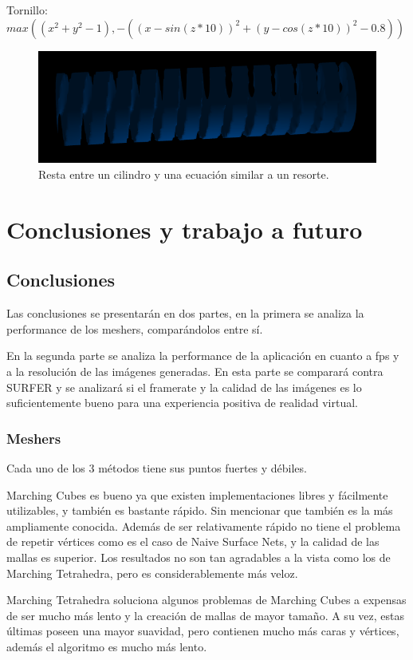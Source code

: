 \documentclass[12pt]{article}
\begin{document}
\clearpage
Tornillo: $max((x^2 + y^2 - 1) ,-((x-sin(z*10) )^2 + (y -cos (z*10))^2 -0.8))$ \\
\begin{figure}[h!]
\includegraphics[width=0.7\linewidth,center]{g5.png}
\caption{Resta entre un cilindro y una ecuación similar a un resorte.}
\end{figure}

\clearpage
\section{Conclusiones y trabajo a futuro}
\subsection{Conclusiones}
Las conclusiones se presentarán en dos partes, en la primera se analiza la performance de los meshers, comparándolos entre sí. 

En la segunda parte se analiza la performance de la aplicación en cuanto a fps y a la resolución de las imágenes generadas. En esta parte se comparará contra SURFER y se analizará si el framerate y la calidad de las imágenes es lo suficientemente bueno para una experiencia positiva de realidad virtual.
\subsubsection{Meshers}
Cada uno de los 3 métodos tiene sus puntos fuertes y débiles. 

Marching Cubes es bueno ya que existen implementaciones libres y fácilmente utilizables, y también es bastante rápido. Sin mencionar que también es la más ampliamente conocida. Además de ser relativamente rápido no tiene el problema de repetir vértices como es el caso de Naive Surface Nets, y la calidad de las mallas es superior. Los resultados no son tan agradables a la vista como los de Marching Tetrahedra, pero es considerablemente más veloz. 

Marching Tetrahedra soluciona algunos problemas de Marching Cubes a expensas de ser mucho más lento y la creación de mallas de mayor tamaño. A su vez, estas últimas poseen una mayor suavidad, pero contienen mucho más caras y vértices, además  el algoritmo es mucho más lento.
\end{document}
